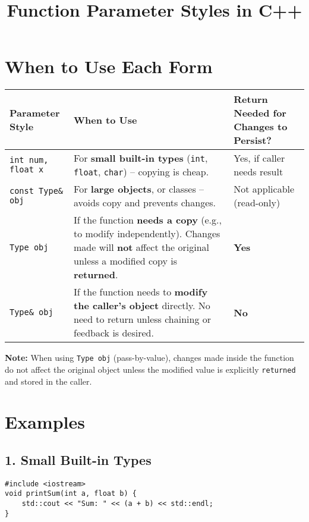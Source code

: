 \documentclass[12pt]{article}
\title{Function Parameter Styles in C++}
\author{}
\date{}
\begin{document}
\maketitle
\tableofcontents

\section*{When to Use Each Form}

\begin{tabular}{|l|p{8cm}|p{4cm}|}
\hline
\textbf{Parameter Style} & \textbf{When to Use} & \textbf{Return Needed for Changes to Persist?} \\
\hline
\texttt{int num, float x} & For \textbf{small built-in types} (\texttt{int}, \texttt{float}, \texttt{char}) -- copying is cheap. & Yes, if caller needs result \\
\hline
\texttt{const Type\& obj} & For \textbf{large objects}, or classes -- avoids copy and prevents changes. & Not applicable (read-only) \\
\hline
\texttt{Type obj} & If the function \textbf{needs a copy} (e.g., to modify independently). Changes made will \textbf{not} affect the original unless a modified copy is \textbf{returned}. & \textbf{Yes} \\
\hline
\texttt{Type\& obj} & If the function needs to \textbf{modify the caller's object} directly. No need to return unless chaining or feedback is desired. & \textbf{No} \\
\hline
\end{tabular}

\vspace{1em}
\noindent\textbf{Note:} When using \texttt{Type obj} (pass-by-value), changes made inside the function do not affect the original object unless the modified value is explicitly \texttt{returned} and stored in the caller.
\newpage
\section{Examples}

\subsection*{1. Small Built-in Types}
\begin{verbatim}
#include <iostream>
void printSum(int a, float b) {
    std::cout << "Sum: " << (a + b) << std::endl;
}
\end{verbatim}
\end{document}

